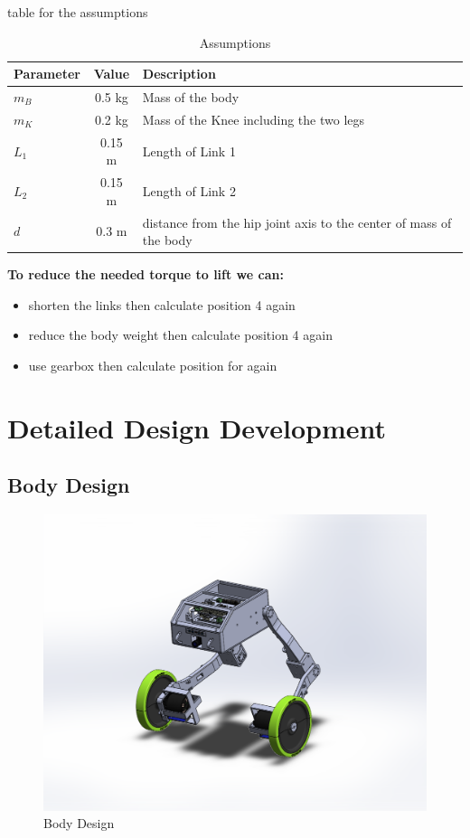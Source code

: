 table for the assumptions
\begin{table}[h]
	\centering
	\caption{Assumptions}
	\label{tab:assumptions}
	\begin{tabular}{lcl}
		\toprule
		Parameter & Value & Description 			  \\
		\midrule
		$m_B$         & 0.5 kg  & Mass of the body  \\
		$m_K$         & 0.2 kg  & Mass of the Knee including the two legs\\
		$L_1$         & 0.15 m   & Length of Link 1  \\
		$L_2$         & 0.15 m   & Length of Link 2   \\
		$d$ 	  	  & 0.3 m   & distance from the hip joint axis to the center of mass of the body   \\
		\bottomrule
	\end{tabular}
\end{table}

\begin{notebox}
	\textbf{To reduce the needed torque to lift we can:}
	\begin{itemize}
		\item shorten the links then calculate position 4 again
		\item reduce the body weight then calculate position 4 again
		\item use gearbox then calculate position for again
	\end{itemize}
\end{notebox}
\section{Detailed Design Development}

\subsection{Body Design}

\begin{figure}[h]
	\centering
	\includegraphics[width=0.7\linewidth]{Robot_Assembly_V2}
	\caption[Body Design]{Body Design}
	\label{fig:bodydesign}
\end{figure}

